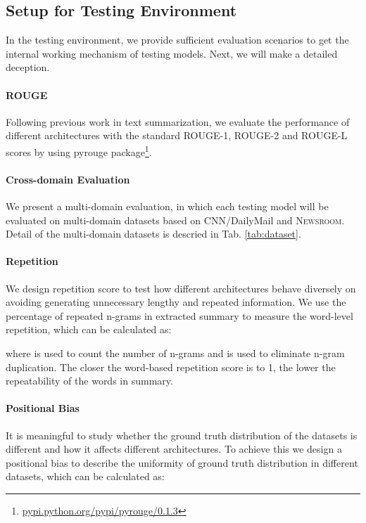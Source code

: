 \documentclass[11pt,a4paper]{article}
\begin{document}
\subsection{Setup for Testing Environment}



In the testing environment, we provide sufficient evaluation scenarios to get the internal working mechanism of testing models. Next, we will make a detailed deception.

\paragraph{ROUGE} Following previous work in text summarization, we evaluate the performance of different architectures with the standard ROUGE-1, ROUGE-2 and ROUGE-L {} scores \cite{lin2004rouge} by using pyrouge package\footnote{\url{pypi.python.org/pypi/pyrouge/0.1.3}}.


\paragraph{Cross-domain Evaluation}
We present a multi-domain evaluation, in which each testing model will be evaluated on multi-domain datasets based on CNN/DailyMail and \textsc{Newsroom}. Detail of the multi-domain datasets is descried in Tab. \ref{tab:dataset}.


\paragraph{Repetition}
We design repetition score to test how different architectures behave diversely on avoiding generating unnecessary lengthy and repeated information.
We use the percentage of repeated n-grams in extracted summary to measure the word-level repetition, which can be calculated as:

where  is used to count the number of n-grams and  is used to eliminate n-gram duplication. The closer the word-based repetition score is to 1, the lower the repeatability of the words in summary.

\paragraph{Positional Bias} It is meaningful to study whether the ground truth distribution of the datasets is different and how it affects different architectures. To achieve this we design a positional bias to describe the uniformity of ground truth distribution in different datasets, which can be calculated as:
\end{document}
